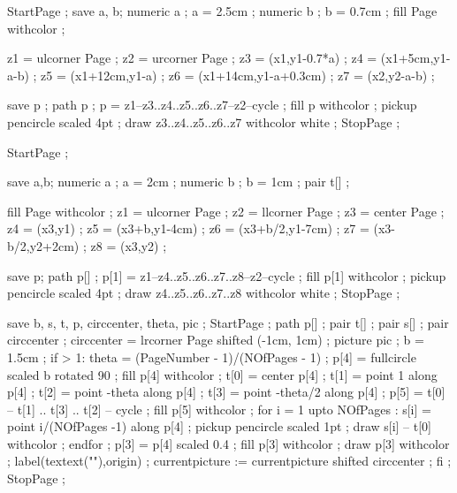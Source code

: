 
StartPage ;
save a, b;
numeric a ; a = 2.5cm ;
numeric b ; b = 0.7cm ;
fill Page withcolor  ;

z1 = ulcorner Page ;
z2 = urcorner Page ;
z3 = (x1,y1-0.7*a) ;
z4 = (x1+5cm,y1-a-b) ;
z5 = (x1+12cm,y1-a) ;
z6 = (x1+14cm,y1-a+0.3cm) ;
z7 = (x2,y2-a-b) ;

save p ;
path p ;
p = z1--z3..z4..z5..z6..z7--z2--cycle ;
fill p withcolor  ;
pickup pencircle scaled 4pt ;
draw z3..z4..z5..z6..z7 withcolor white ;
StopPage ;
\stopuniqueMPgraphic 

StartPage ;

save a,b;
numeric a ; a = 2cm ;
numeric b ; b = 1cm ;
pair  t[] ;

fill Page withcolor  ;
z1 = ulcorner Page ;
z2 = llcorner Page ;
z3 = center Page ;
z4 = (x3,y1) ;
z5 = (x3+b,y1-4cm) ;
z6 = (x3+b/2,y1-7cm) ;
z7 = (x3-b/2,y2+2cm) ;
z8 = (x3,y2) ;

save p;
path p[] ;
p[1] = z1--z4..z5..z6..z7..z8--z2--cycle ;
fill p[1] withcolor  ;
pickup pencircle scaled 4pt ;
draw z4..z5..z6..z7..z8 withcolor white ;
StopPage ;
\stopuniqueMPgraphic 

save b, s, t, p, circcenter, theta, pic ;
StartPage ;
path p[] ;
pair t[] ;
pair s[] ;
pair circcenter ; circcenter = lrcorner Page shifted (-1cm, 1cm) ;
picture pic ;
b = 1.5cm ;
if \realfolio > 1:
	theta = (PageNumber - 1)/(NOfPages - 1) ;
	p[4] = fullcircle scaled b rotated 90 ;
	fill p[4] withcolor   ;
	t[0] = center p[4] ;
	t[1] = point 1 along p[4] ;
	t[2] = point -theta along p[4] ;
	t[3] = point -theta/2 along p[4] ;
	p[5] = t[0] -- t[1] .. t[3] .. t[2] -- cycle ;
	fill p[5] withcolor  ;
	for i = 1 upto NOfPages :
		s[i] = point i/(NOfPages -1) along p[4] ;
		pickup pencircle scaled 1pt ;
		draw s[i] -- t[0] withcolor  ;
	endfor ;
	p[3] = p[4] scaled 0.4 ;
	fill p[3] withcolor  ;
	draw p[3] withcolor  ;
	label(textext("\switchtobodyfont[10pt]\pagenumber"),origin) ;
	currentpicture := currentpicture shifted circcenter ;
fi ;
StopPage ;
\stopuseMPgraphic 

